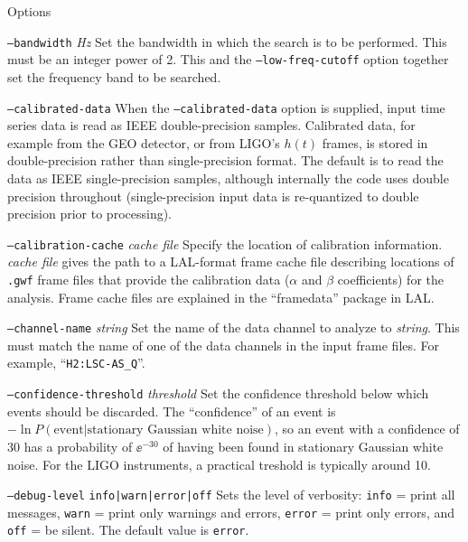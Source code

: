 \documentclass[10pt]{article}
\newcommand{\option}[1]{\texttt{#1}}
\newcommand{\parm}[1]{\textit{#1}}
\newenvironment{entry}%
{\begin{list}{}{\renewcommand{\makelabel}[1]%
{\parbox[b]{\labelwidth}{\makebox[0pt][l]{\textbf{##1}}\\}}%
\setlength{\labelwidth}{1em}%
\setlength{\labelsep}{1em}%
\setlength{\leftmargin}{2em}%
\setlength{\topsep}{\medskipamount}%
\setlength{\itemsep}{\medskipamount}%
\setlength{\parsep}{\medskipamount}%
\setlength{\listparindent}{0pt}}}
{\end{list}}
\begin{document}
\begin{entry}
\item[Options]\leavevmode
\begin{entry}
\item[\option{--bandwidth} \parm{Hz}]
Set the bandwidth in which the search is to be performed.  This must be an
integer power of 2.  This and the \option{--low-freq-cutoff} option
together set the frequency band to be searched.

\item[\option{--calibrated-data}]
When the \option{--calibrated-data} option is supplied, input time series
data is read as IEEE double-precision samples.  Calibrated data, for
example from the GEO detector, or from LIGO's \(h(t)\) frames, is stored in
double-precision rather than single-precision format.  The default is to
read the data as IEEE single-precision samples, although internally the
code uses double precision throughout (single-precision input data is
re-quantized to double precision prior to processing).

\item[\option{--calibration-cache} \parm{cache file}]
Specify the location of calibration information.  \parm{cache file} gives
the path to a LAL-format frame cache file describing locations of
\texttt{.gwf} frame files that provide the calibration data ($\alpha$ and
$\beta$ coefficients) for the analysis.  Frame cache files are explained in
the ``framedata'' package in LAL.

\item[\option{--channel-name} \parm{string}]
Set the name of the data channel to analyze to \parm{string}.  This must
match the name of one of the data channels in the input frame files.  For
example, ``\verb|H2:LSC-AS_Q|''.

\item[\option{--confidence-threshold} \parm{threshold}]
Set the confidence threshold below which events should be discarded.  The
``confidence'' of an event is \(-\ln P(\text{event} | \text{stationary
Gaussian white noise})\), so an event with a confidence of 30 has a
probability of \(\ee^{-30}\) of having been found in stationary Gaussian
white noise.  For the LIGO instruments, a practical treshold is typically
around 10.

\item[\option{--debug-level} \option{info|warn|error|off}]
Sets the level of verbosity:  \option{info} = print all messages,
\option{warn} = print only warnings and errors, \option{error} = print only
errors, and \option{off} = be silent.  The default value is \option{error}.


\end{entry}
\end{entry}
\end{document}
